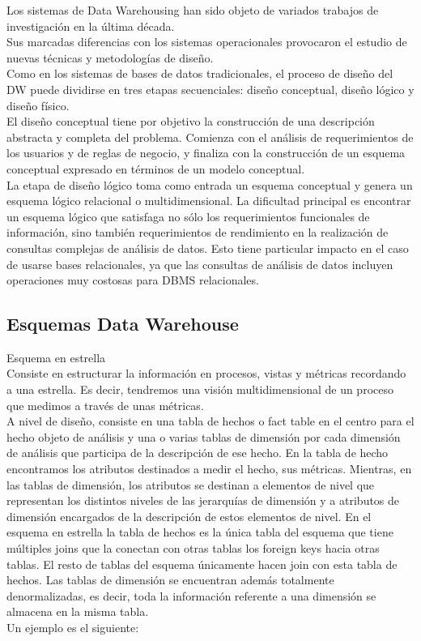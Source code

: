 \documentclass[DIV=calc, paper=a4, fontsize=11pt, twocolumn]{scrartcl}	 %
\begin{document}
Los sistemas de Data Warehousing han sido objeto de variados trabajos de investigaci\'{o}n en la \'{u}ltima d\'{e}cada.\\
Sus marcadas diferencias con los sistemas operacionales provocaron el estudio de nuevas t\'{e}cnicas y metodolog\'{i}as de dise\~{n}o.\\
Como en los sistemas de bases de datos tradicionales, el proceso de dise\~{n}o del DW puede dividirse en tres etapas secuenciales: dise\~{n}o conceptual, 
dise\~{n}o l\'{o}gico y dise\~{n}o f\'{i}sico.\\
El dise\~{n}o conceptual tiene por objetivo la construcci\'{o}n de una descripci\'{o}n abstracta y completa del problema. Comienza con el an\'{a}lisis  de requerimientos de los usuarios y de reglas de negocio, y finaliza con la construcci\'{o}n de un esquema conceptual expresado en 
t\'{e}rminos de un modelo conceptual.\\
La etapa de dise\~{n}o l\'{o}gico toma como entrada un esquema conceptual y genera un esquema l\'{o}gico relacional o multidimensional. La dificultad principal es encontrar un esquema l\'{o}gico que satisfaga no s\'{o}lo los requerimientos funcionales de informaci\'{o}n, sino tambi\'{e}n requerimientos de rendimiento en la realizaci\'{o}n de consultas complejas de an\'{a}lisis de datos. Esto tiene particular impacto en el caso de usarse bases relacionales, ya que las consultas de an\'{a}lisis de datos incluyen operaciones muy costosas para DBMS relacionales.


\subsection*{Esquemas Data Warehouse}
Esquema en estrella\\
Consiste en estructurar la informaci\'{o}n en procesos, vistas y m\'{e}tricas recordando a una estrella. Es decir, tendremos una visi\'{o}n 
multidimensional de un proceso que medimos a trav\'{e}s de unas m\'{e}tricas.\\
A nivel de dise\~{n}o, consiste en una tabla de hechos o fact table en el centro para el hecho objeto de an\'{a}lisis y una o varias 
tablas de dimensi\'{o}n por cada dimensi\'{o}n de an\'{a}lisis que participa de la descripci\'{o}n de ese hecho. En la tabla de hecho encontramos
los atributos destinados a medir el hecho, sus m\'{e}tricas. Mientras, en las tablas de dimensi\'{o}n, los atributos se destinan a 
elementos de nivel que representan los distintos niveles de las jerarqu\'{i}as de dimensi\'{o}n y a atributos de dimensi\'{o}n encargados 
de la descripci\'{o}n de estos elementos de nivel. En el esquema en estrella la tabla de hechos es la \'{u}nica tabla del esquema 
que tiene m\'{u}ltiples joins que la conectan con otras tablas los foreign keys hacia otras tablas. El resto de tablas del 
esquema \'{u}nicamente hacen join con esta tabla de hechos. Las tablas de dimensi\'{o}n se encuentran 
adem\'{a}s totalmente denormalizadas, es decir, toda la informaci\'{o}n referente a una dimensi\'{o}n se almacena en la misma tabla.\\
Un ejemplo es el siguiente:\\
\end{document}
